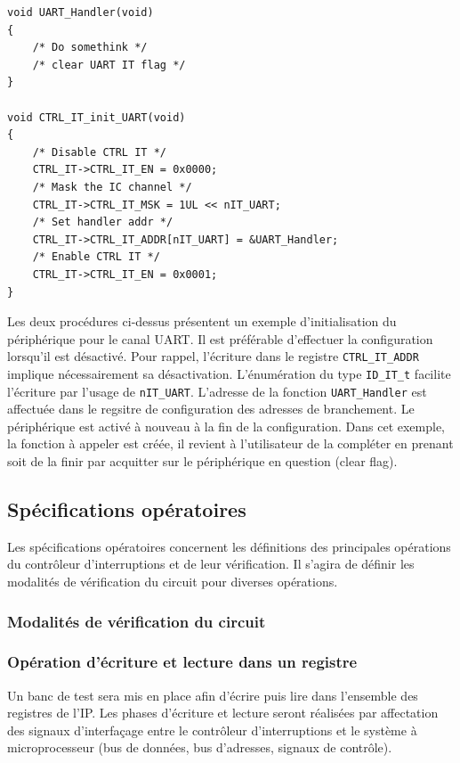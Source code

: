 \begin{lstlisting}[style=CStyle]
void UART_Handler(void)
{
    /* Do somethink */
    /* clear UART IT flag */
}

void CTRL_IT_init_UART(void)
{
    /* Disable CTRL IT */
    CTRL_IT->CTRL_IT_EN = 0x0000;
    /* Mask the IC channel */
    CTRL_IT->CTRL_IT_MSK = 1UL << nIT_UART;
    /* Set handler addr */
    CTRL_IT->CTRL_IT_ADDR[nIT_UART] = &UART_Handler;
    /* Enable CTRL IT */
    CTRL_IT->CTRL_IT_EN = 0x0001;
}
\end{lstlisting}
Les deux procédures ci-dessus présentent un exemple d'initialisation du périphérique pour le canal \gls{UART}.
Il est préférable d'effectuer la configuration lorsqu'il est désactivé.
Pour rappel, l'écriture dans le registre \texttt{CTRL\_IT\_ADDR} implique nécessairement sa désactivation.
L'énumération du type \texttt{ID\_IT\_t} facilite l'écriture par l'usage de \texttt{nIT\_UART}.
L'adresse de la fonction \texttt{UART\_Handler} est affectuée dans le regsitre de configuration des adresses de branchement.
Le périphérique est activé à nouveau à la fin de la configuration.
Dans cet exemple, la fonction à appeler est créée, il revient à l'utilisateur de la compléter en prenant soit de la finir par acquitter sur le périphérique en question (clear flag).


\subsection{Spécifications opératoires}

Les spécifications opératoires concernent les définitions des principales opérations du contrôleur d'interruptions et de leur vérification.
Il s'agira de définir les modalités de vérification du circuit pour diverses opérations.

\subsubsection{Modalités de vérification du circuit}

\subsubsection*{Opération d'écriture et lecture dans un registre}

Un banc de test sera mis en place afin d'écrire puis lire dans l'ensemble des registres de l'IP.
Les phases d'écriture et lecture seront réalisées par affectation des signaux d'interfaçage entre le contrôleur d'interruptions et le système à microprocesseur (bus de données, bus d'adresses, signaux de contrôle).

